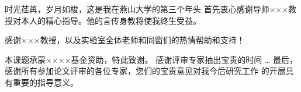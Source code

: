 \makeatletter
{}
  \pagestyle{fancy}%
  \fancyhf{}
\makeatother

\begin{thanks}
时光荏苒，岁月如梭，这是我在燕山大学的第三个年头
首先衷心感谢导师×××教授对本人的精心指导。他的言传身教将使我终生受益。

感谢×××教授，以及实验室全体老师和同窗们的热情帮助和支持！

本课题承蒙××××基金资助，特此致谢。
感谢评审专家抽出宝贵的时间
…
最后，感谢所有参加论文评审的各位专家，您们的宝贵意见对我今后研究工作
的开展具有重要的指导意义。
\end{thanks}
